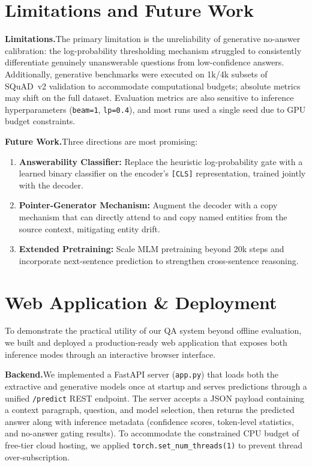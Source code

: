 \documentclass[10pt,twocolumn]{article}
\begin{document}
\section{Limitations and Future Work}

\textbf{Limitations.}\quad The primary limitation is the unreliability of generative no-answer calibration: the log-probability thresholding mechanism struggled to consistently differentiate genuinely unanswerable questions from low-confidence answers. Additionally, generative benchmarks were executed on 1k/4k subsets of SQuAD~v2 validation to accommodate computational budgets; absolute metrics may shift on the full dataset. Evaluation metrics are also sensitive to inference hyperparameters (\texttt{beam=1}, \texttt{lp=0.4}), and most runs used a single seed due to GPU budget constraints.

\textbf{Future Work.}\quad Three directions are most promising:
\begin{enumerate}[leftmargin=1.2em,noitemsep,topsep=2pt]
\item \textbf{Answerability Classifier:} Replace the heuristic log-probability gate with a learned binary classifier on the encoder's \texttt{[CLS]} representation, trained jointly with the decoder.
\item \textbf{Pointer-Generator Mechanism:} Augment the decoder with a copy mechanism that can directly attend to and copy named entities from the source context, mitigating entity drift.
\item \textbf{Extended Pretraining:} Scale MLM pretraining beyond 20k steps and incorporate next-sentence prediction to strengthen cross-sentence reasoning.
\end{enumerate}

\section{Web Application \& Deployment}

To demonstrate the practical utility of our QA system beyond offline evaluation, we built and deployed a production-ready web application that exposes both inference modes through an interactive browser interface.

\textbf{Backend.}\quad We implemented a FastAPI server (\texttt{app.py}) that loads both the extractive and generative models once at startup and serves predictions through a unified \texttt{/predict} REST endpoint. The server accepts a JSON payload containing a context paragraph, question, and model selection, then returns the predicted answer along with inference metadata (confidence scores, token-level statistics, and no-answer gating results). To accommodate the constrained CPU budget of free-tier cloud hosting, we applied \texttt{torch.set\_num\_threads(1)} to prevent thread over-subscription.
\end{document}
